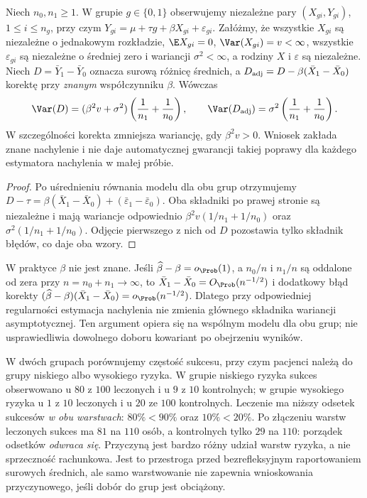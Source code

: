 \begin{twierdzenie}\label{thm:ancova-variance}
Niech $n_0,n_1\ge1$. W grupie $g\in\{0,1\}$ obserwujemy niezależne pary $(X_{gi},Y_{gi})$, $1\le i\le n_g$, przy czym
$Y_{gi}=\mu+\tau g+\beta X_{gi}+\varepsilon_{gi}$.
Załóżmy, że wszystkie $X_{gi}$ są niezależne o jednakowym rozkładzie, $\E X_{gi}=0$, $\Var(X_{gi})=v<\infty$, wszystkie $\varepsilon_{gi}$ są niezależne o średniej zero i wariancji $\sigma^2<\infty$, a rodziny $X$ i $\varepsilon$ są niezależne. Niech $D=\bar Y_1-\bar Y_0$ oznacza surową różnicę średnich, a $D_{\rm adj}=D-\beta(\bar X_1-\bar X_0)$ korektę przy \emph{znanym} współczynniku $\beta$. Wówczas
\[
 \Var(D)=(\beta^2v+\sigma^2)\left(\frac1{n_1}+\frac1{n_0}\right),\qquad
 \Var(D_{\rm adj})=\sigma^2\left(\frac1{n_1}+\frac1{n_0}\right).
\]
W szczególności korekta zmniejsza wariancję, gdy $\beta^2v>0$. Wniosek zakłada znane nachylenie i nie daje automatycznej gwarancji takiej poprawy dla każdego estymatora nachylenia w małej próbie.
\end{twierdzenie}
\begin{proof}
Po uśrednieniu równania modelu dla obu grup otrzymujemy
$D-\tau=\beta(\bar X_1-\bar X_0)+(\bar\varepsilon_1-\bar\varepsilon_0)$.
Oba składniki po prawej stronie są niezależne i mają wariancje odpowiednio
$\beta^2v(1/n_1+1/n_0)$ oraz $\sigma^2(1/n_1+1/n_0)$.
Odjęcie pierwszego z nich od $D$ pozostawia tylko składnik błędów, co daje oba wzory.
\end{proof}

\begin{uwaga}
W praktyce $\beta$ nie jest znane. Jeśli $\widehat\beta-\beta=o_\Prob(1)$, a $n_0/n$ i $n_1/n$ są oddalone od zera przy $n=n_0+n_1\to\infty$, to $\bar X_1-\bar X_0=O_\Prob(n^{-1/2})$ i dodatkowy błąd korekty
$(\widehat\beta-\beta)(\bar X_1-\bar X_0)=o_\Prob(n^{-1/2})$.
Dlatego przy odpowiedniej regularności estymacja nachylenia nie zmienia głównego składnika wariancji asymptotycznej. Ten argument opiera się na wspólnym modelu dla obu grup; nie usprawiedliwia dowolnego doboru kowariant po obejrzeniu wyników.
\end{uwaga}

\begin{przyklad}
W dwóch grupach porównujemy częstość sukcesu, przy czym pacjenci należą do grupy niskiego albo wysokiego ryzyka. W grupie niskiego ryzyka sukces obserwowano u $80$ z $100$ leczonych i u $9$ z $10$ kontrolnych; w grupie wysokiego ryzyka u $1$ z $10$ leczonych i u $20$ ze $100$ kontrolnych. Leczenie ma niższy odsetek sukcesów \emph{w obu warstwach}: $80\%<90\%$ oraz $10\%<20\%$. Po złączeniu warstw leczonych sukces ma $81$ na $110$ osób, a kontrolnych tylko $29$ na $110$: porządek odsetków \emph{odwraca się}. Przyczyną jest bardzo różny udział warstw ryzyka, a nie sprzeczność rachunkowa. Jest to przestroga przed bezrefleksyjnym raportowaniem surowych średnich, ale samo warstwowanie nie zapewnia wnioskowania przyczynowego, jeśli dobór do grup jest obciążony.
\end{przyklad}

